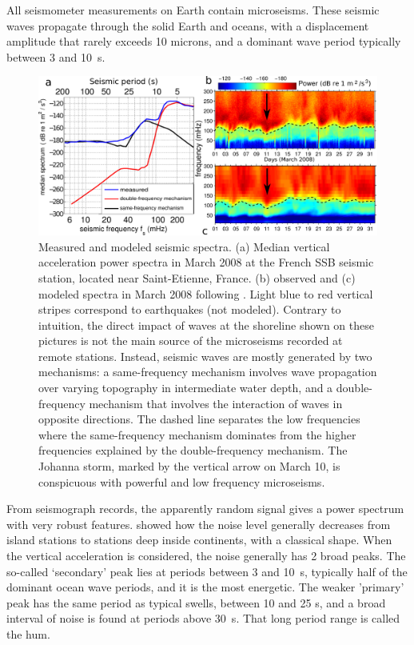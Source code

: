  All seismometer measurements on Earth contain microseisms. These seismic waves propagate through 
the solid Earth and oceans, with a displacement amplitude that rarely exceeds 10 microns, 
and a dominant wave period typically between 3 and 10~s.
\begin{figure}[htb]
\centerline{\includegraphics[width=\textwidth]{FIGS_CH_SISMO/microseisms_spectra_small.pdf}}
  \caption{Measured and modeled seismic spectra. (a) Median vertical acceleration power spectra in March 2008 at the French SSB seismic station, 
  located near Saint-Etienne, France. (b) observed and (c) modeled spectra in March 2008 following \cite{Ardhuin&al.2015}. 
  Light blue to red vertical stripes correspond to earthquakes (not modeled).   Contrary to intuition, the direct impact of waves 
  at the shoreline shown on these pictures is not the main source of the microseisms recorded at remote stations. Instead,
  seismic waves are mostly generated by two mechanisms: a same-frequency mechanism involves wave propagation over varying topography in intermediate 
  water depth, and a double-frequency mechanism that involves the interaction of waves in opposite directions. 
  The dashed line separates the low frequencies where the same-frequency mechanism dominates from the higher frequencies explained by the 
  double-frequency mechanism. The Johanna storm, marked by the vertical arrow on March 10, is conspicuous with powerful and low frequency microseisms. %
}
\label{fig:microseism_spectra}
\end{figure}

From seismograph records, the apparently random signal gives a power spectrum with very robust features. \cite{Stutzmann&al.2000} showed how the 
noise level generally decreases from island stations to stations deep inside continents, with a classical shape. When the 
vertical acceleration is considered, the noise generally has 2 broad peaks.  The so-called `secondary' peak lies at periods between 
3 and 10~s, typically half of the dominant ocean wave periods, and it is the most energetic. The weaker 'primary' peak has the same period as typical swells, between 10 and 25 s, and 
a broad interval of noise is found at periods above 30~s. That long period range is called the hum. 

